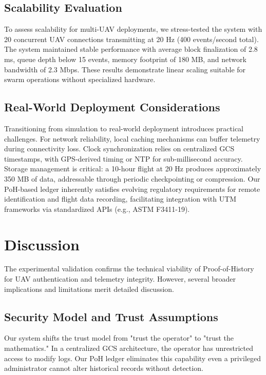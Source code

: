 \documentclass[preprint,12pt]{elsarticle}
\begin{document}
\subsection{Scalability Evaluation}

To assess scalability for multi-UAV deployments, we stress-tested the system with 20 concurrent UAV connections transmitting at 20 Hz (400 events/second total). The system maintained stable performance with average block finalization of 2.8 ms, queue depth below 15 events, memory footprint of 180 MB, and network bandwidth of 2.3 Mbps. These results demonstrate linear scaling suitable for swarm operations without specialized hardware.

\subsection{Real-World Deployment Considerations}

Transitioning from simulation to real-world deployment introduces practical challenges. For network reliability, local caching mechanisms can buffer telemetry during connectivity loss. Clock synchronization relies on centralized GCS timestamps, with GPS-derived timing or NTP for sub-millisecond accuracy. Storage management is critical: a 10-hour flight at 20 Hz produces approximately 350 MB of data, addressable through periodic checkpointing or compression. Our PoH-based ledger inherently satisfies evolving regulatory requirements for remote identification and flight data recording, facilitating integration with UTM frameworks via standardized APIs (e.g., ASTM F3411-19).

\section{Discussion}

The experimental validation confirms the technical viability of Proof-of-History for UAV authentication and telemetry integrity. However, several broader implications and limitations merit detailed discussion.

\subsection{Security Model and Trust Assumptions}

Our system shifts the trust model from "trust the operator" to "trust the mathematics." In a centralized GCS architecture, the operator has unrestricted access to modify logs. Our PoH ledger eliminates this capability even a privileged administrator cannot alter historical records without detection.
\end{document}
